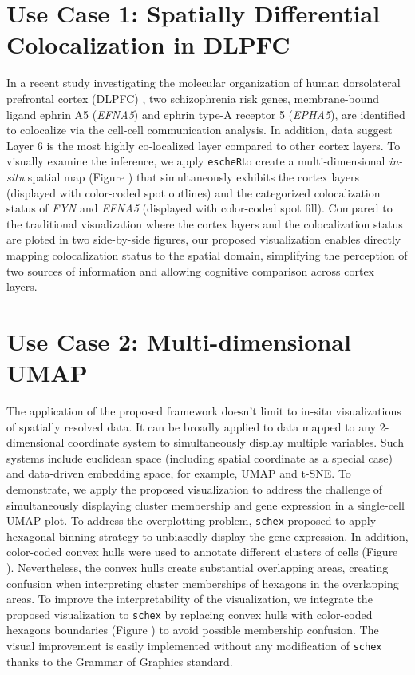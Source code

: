 \documentclass[11pt]{article}
\newcommand{\coloc}{\texttt{escheR}}
\begin{document}
\section*{Use Case 1: Spatially Differential Colocalization in DLPFC}
In a recent study investigating the molecular organization of human dorsolateral prefrontal cortex (DLPFC) \cite{huukimyers_2023}, two schizophrenia risk genes, membrane-bound ligand ephrin A5 (\textit{EFNA5}) and ephrin type-A receptor 5 (\textit{EPHA5}), are identified to colocalize via the cell-cell communication analysis. In addition, data suggest Layer 6 is the most highly co-localized layer compared to other cortex layers. To visually examine the inference, we apply \coloc to create a multi-dimensional \textit{in-situ} spatial map (Figure \label{fig:visual}) that simultaneously exhibits the cortex layers (displayed with color-coded spot outlines) and the categorized colocalization status of \textit{FYN} and \textit{EFNA5} (displayed with color-coded spot fill). Compared to the traditional visualization where the cortex layers and the colocalization status are ploted in two side-by-side figures, our proposed visualization enables directly mapping colocalization status to the spatial domain, simplifying the perception of two sources of information and allowing cognitive comparison across cortex layers. 

\section*{Use Case 2: Multi-dimensional UMAP}
The application of the proposed framework doesn't limit to in-situ visualizations of spatially resolved data. It can be broadly applied to data mapped to any 2-dimensional coordinate system to simultaneously display multiple variables. Such systems include euclidean space (including spatial coordinate as a special case) and data-driven embedding space, for example, UMAP and t-SNE. To demonstrate, we apply the proposed visualization to address the challenge of simultaneously displaying cluster membership and gene expression in a single-cell UMAP plot. To address the overplotting problem, \texttt{schex} proposed to apply hexagonal binning strategy to unbiasedly display the gene expression.\cite{freytag_2020} In addition, color-coded convex hulls were used to annotate different clusters of cells (Figure \label{fig:visual}). Nevertheless, the convex hulls create substantial overlapping areas, creating confusion when interpreting cluster memberships of hexagons in the overlapping areas. To improve the interpretability of the visualization, we integrate the proposed visualization to \texttt{schex} by replacing convex hulls with color-coded hexagons boundaries  (Figure \label{fig:visual}) to avoid possible membership confusion. The visual improvement is easily implemented without any modification of \texttt{schex} thanks to the Grammar of Graphics \cite{wilkinson_2012} standard.
\end{document}
